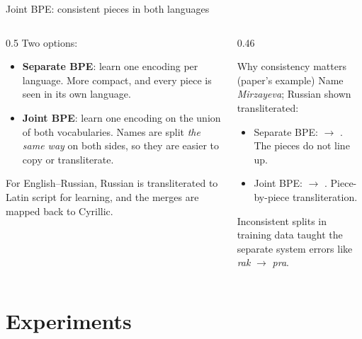 \documentclass[aspectratio=169,11pt]{beamer}
\begin{document}
\begin{frame}{Joint BPE: consistent pieces in both languages}
  \begin{columns}[T]
    \begin{column}{0.5\textwidth}
      \small
      Two options:
      \begin{itemize}
        \item \textbf{Separate BPE}: learn one encoding per language. More compact, and every piece is seen in its own language.
        \item \textbf{Joint BPE}: learn one encoding on the union of both vocabularies. Names are split \emph{the same way} on both sides, so they are easier to copy or transliterate.
      \end{itemize}
      For English--Russian, Russian is transliterated to Latin script for learning, and the merges are mapped back to Cyrillic.
    \end{column}
    \begin{column}{0.46\textwidth}
      \begin{exampleblock}{Why consistency matters (paper's example)}
        \small
        Name \emph{Mirzayeva}; Russian shown transliterated:
        \begin{itemize}
          \item Separate BPE:  $\to$ . The pieces do not line up.
          \item Joint BPE:  $\to$ . Piece-by-piece transliteration.
        \end{itemize}
        Inconsistent splits in training data taught the separate system errors like \emph{rak} $\to$ \emph{pra}.
      \end{exampleblock}
    \end{column}
  \end{columns}
\end{frame}

\section{Experiments}
\end{document}
